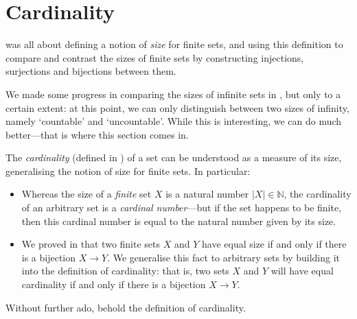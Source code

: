 \section{Cardinality}

 was all about defining a notion of \textit{size} for finite sets, and using this definition to compare and contrast the sizes of finite sets by constructing injections, surjections and bijections between them.

We made some progress in comparing the sizes of infinite sets in , but only to a certain extent: at this point, we can only distinguish between two sizes of infinity, namely `countable' and `uncountable'. While this is interesting, we can do much better---that is where this section comes in.

The \textit{cardinality} (defined in ) of a set can be understood as a measure of its size, generalising the notion of size for finite sets. In particular:
\begin{itemize}
\item Whereas the size of a \textit{finite} set $X$ is a natural number $|X| \in \mathbb{N}$, the cardinality of an arbitrary set is a \textit{cardinal number}---but if the set happens to be finite, then this cardinal number is equal to the natural number given by its size.
\item We proved in  that two finite sets $X$ and $Y$ have equal size if and only if there is a bijection $X \to Y$. We generalise this fact to arbitrary sets by building it into the definition of cardinality: that is, two sets $X$ and $Y$ will have equal cardinality if and only if there is a bijection $X \to Y$.
\end{itemize}

Without further ado, behold the definition of cardinality.

